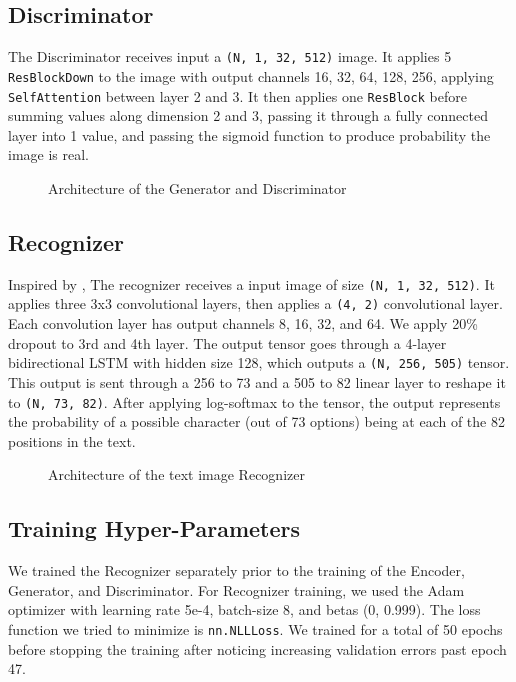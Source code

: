 \documentclass{article} %
\begin{document}
\subsection{Discriminator}
The Discriminator receives input a \texttt{(N, 1, 32, 512)} image. It applies 5 \texttt{ResBlockDown} to the image with output channels 16, 32, 64, 128, 256, applying \texttt{SelfAttention} between layer 2 and 3. It then applies one \texttt{ResBlock} before summing values along dimension 2 and 3, passing it through a fully connected layer into 1 value, and passing the sigmoid function to produce probability the image is real.

\begin{figure}[!hbpt]
    \begin{center}
        
    \end{center}
    \caption{Architecture of the Generator and Discriminator}
    \label{fig:generator_discriminator}
\end{figure}

\subsection{Recognizer}
Inspired by \citep{fr-crnn}, The recognizer receives a input image of size \texttt{(N, 1, 32, 512)}. It applies three 3x3 convolutional layers, then applies a \texttt{(4, 2)} convolutional layer. Each convolution layer has output channels 8, 16, 32, and 64. We apply 20\% dropout to 3rd and 4th layer. The output tensor goes through a 4-layer bidirectional LSTM with hidden size 128, which outputs a \texttt{(N, 256, 505)} tensor. This output is sent through a 256 to 73 and a 505 to 82 linear layer to reshape it to \texttt{(N, 73, 82)}. After applying log-softmax to the tensor, the output represents the probability of a possible character (out of 73 options) being at each of the 82 positions in the text.

\begin{figure}[!hbpt]
    \begin{center}
        
    \end{center}
    \caption{Architecture of the text image Recognizer}
    \label{fig:recognizer}
\end{figure}

\subsection{Training Hyper-Parameters}
We trained the Recognizer separately prior to the training of the Encoder, Generator, and Discriminator.
For Recognizer training, we used the Adam optimizer with learning rate 5e-4, batch-size 8, and betas (0, 0.999). The loss function we tried to minimize is \texttt{nn.NLLLoss}. We trained for a total of 50 epochs before stopping the training after noticing increasing validation errors past epoch 47.
\end{document}
